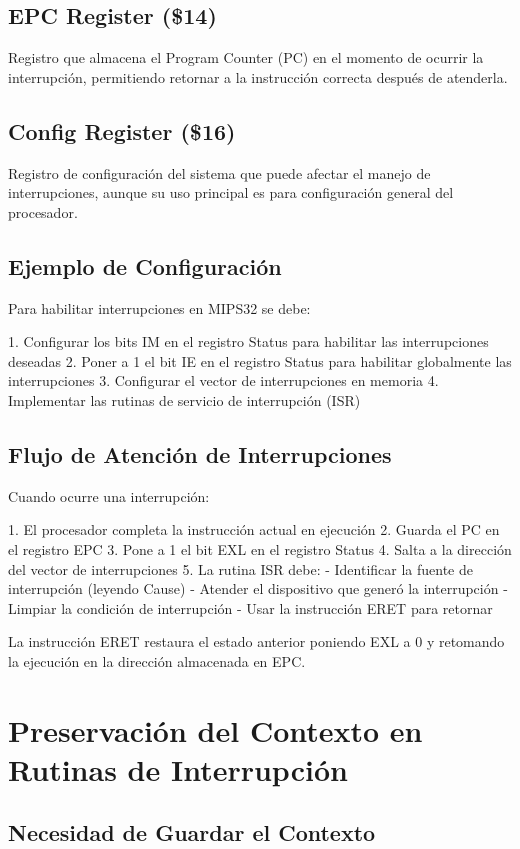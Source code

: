 \documentclass{article}
\begin{document}
\subsection{EPC Register (\$14)}
Registro que almacena el Program Counter (PC) en el momento de ocurrir la interrupción, permitiendo retornar a la instrucción correcta después de atenderla.

\subsection{Config Register (\$16)}
Registro de configuración del sistema que puede afectar el manejo de interrupciones, aunque su uso principal es para configuración general del procesador.

\subsection{Ejemplo de Configuración}

Para habilitar interrupciones en MIPS32 se debe:

1. Configurar los bits IM en el registro Status para habilitar las interrupciones deseadas
2. Poner a 1 el bit IE en el registro Status para habilitar globalmente las interrupciones
3. Configurar el vector de interrupciones en memoria
4. Implementar las rutinas de servicio de interrupción (ISR)

\subsection{Flujo de Atención de Interrupciones}

Cuando ocurre una interrupción:

1. El procesador completa la instrucción actual en ejecución
2. Guarda el PC en el registro EPC
3. Pone a 1 el bit EXL en el registro Status
4. Salta a la dirección del vector de interrupciones
5. La rutina ISR debe:
   - Identificar la fuente de interrupción (leyendo Cause)
   - Atender el dispositivo que generó la interrupción
   - Limpiar la condición de interrupción
   - Usar la instrucción ERET para retornar

La instrucción ERET restaura el estado anterior poniendo EXL a 0 y retomando la ejecución en la dirección almacenada en EPC.
\section{Preservación del Contexto en Rutinas de Interrupción}
\subsection{Necesidad de Guardar el Contexto}
\end{document}
